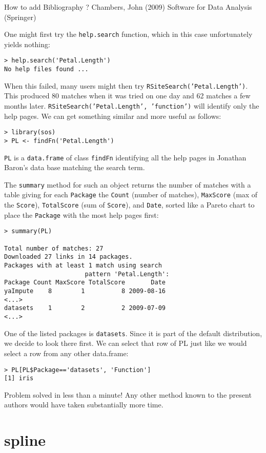 How to add Bibliography ?
Chambers, John (2009) Software for Data Analysis (Springer)

One might first try the {\tt help.search} function, which 
in this case unfortunately yields nothing:  
\begin{verbatim}
> help.search('Petal.Length')
No help files found ...
\end{verbatim}
When this failed, many users might then try
{\tt RSiteSearch('Petal.Length')}.  This produced 80 matches when 
it was tried on one day and 62 matches a few months later.
{\tt RSiteSearch('Petal.Length', 'function')} will identify
only the help pages.  We can get something similar and more 
useful as follows:
\begin{verbatim}
> library(sos)
> PL <- findFn('Petal.Length')
\end{verbatim}
{\tt PL} is a {\tt data.frame} of class {\tt findFn} identifying
all the help pages in Jonathan Baron's data base matching the
search term.

The {\tt summary} method for such an object returns
the number of matches with a table giving for each {\tt Package}
the {\tt Count} (number of matches), {\tt MaxScore} (max of the
{\tt Score}), {\tt TotalScore} (sum of {\tt Score}), and {\tt Date},
sorted like a Pareto chart to place the {\tt Package} with the most
help pages first:
\begin{verbatim}
> summary(PL)

Total number of matches: 27
Downloaded 27 links in 14 packages.
Packages with at least 1 match using search 
                      pattern 'Petal.Length':
Package Count MaxScore TotalScore       Date
yaImpute    8        1          8 2009-08-16
<...>
datasets    1        2          2 2009-07-09
<...>
\end{verbatim}
One of the listed packages is {\tt datasets}.  Since it is part of the
default \R{} distribution, we decide to look there first.  We can
select that row of PL just like we would select a row from any other
data.frame:
\begin{verbatim}
> PL[PL$Package=='datasets', 'Function']
[1] iris
\end{verbatim}
Problem solved in less than a minute!  Any other method known
to the present authors would have taken substantially more time.

\section*{spline}

